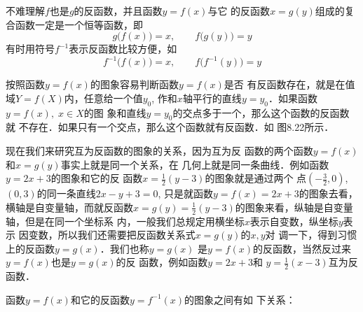 不难理解$f$也是$g$的反函数，并且函数$y=f(x)$与它
的反函数$x=g(y)$组成的复合函数一定是一个恒等函数，即
\[ g\big(f(x)\big)=x,\qquad f\big(g(y)\big)= y\]
有时用符号$f^{-1}$表示反函数比较方便，如
\[f^{-1}\big(f(x)\big)=x,\qquad f\big(f^{-1}(y)\big)=y\]

按照函数$y=f(x)$的图象容易判断函数$y=f(x)$是否
有反函数存在，就是在值域$Y=f(X)$内，任意给一个值$y_0$,
作和$x$轴平行的直线$y=y_0$．如果函数$y=f(x),\; x\in X$的图
象和直线$y=y_0$的交点多于一个，那么这个函数的反函数就
不存在．如果只有一个交点，那么这个函数就有反函数．如
图8.22所示．

\begin{figure}[htp]
    \centering
    \caption{}
\end{figure}

现在我们来研究互为反函数的图象的关系，因为互为反
函数的两个函数$y=f(x)$和$x=g(y)$事实上就是同一个关系，在
几何上就是同一条曲线．例如函数$y=2x+3$的图象和它的反
函数$x=\frac{1}{2}(y-3)$的图象就是通过两个
点$\left(-\frac{3}{2},0\right)$, $(0,3)$的同一条直线$2x-y+3=0$, 只是就函数$y=f(x)=2x+
3$的图象去看，横轴是自变量轴，而就反函数$x=g(y)=\frac{1}{2}
(y-3)$的图象来看，纵轴是自变量轴，但是在同一个坐标系
内，一般我们总规定用横坐标$x$表示自变数，纵坐标$y$表示
因变数，所以我们还需要把反函数关系式$x=g(y)$的$x,y$对
调一下，得到习惯上的反函数$y=g(x)$．我们也称$y=g(x)$
是$y=f(x)$的反函数，当然反过来$y=f(x)$也是$y=g(x)$的反
函数，例如函数$y=2x+3$和 $y=\frac{1}{2}(x-3)$互为反函数．

函数$y=f(x)$和它的反函数$y=f^{-1}(x)$的图象之间有如
下关系：

